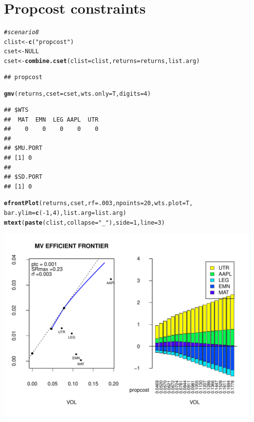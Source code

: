 \documentclass{uwstat518}\usepackage[]{graphicx}\usepackage[]{color}
\makeatletter
\def\maxwidth{ %
  \ifdim\Gin@nat@width>\linewidth
    \linewidth
  \else
    \Gin@nat@width
  \fi
}
\newcommand{\hlstr}[1]{\textcolor[rgb]{0.192,0.494,0.8}{#1}}%
\newcommand{\hlcom}[1]{\textcolor[rgb]{0.678,0.584,0.686}{\textit{#1}}}%
\newcommand{\hlkwd}[1]{\textcolor[rgb]{0.737,0.353,0.396}{\textbf{#1}}}%
\newenvironment{kframe}{%
 \def\at@end@of@kframe{}%
 \ifinner\ifhmode%
  \def\at@end@of@kframe{\end{minipage}}%
  \begin{minipage}{\columnwidth}%
 \fi\fi%
 \def\FrameCommand##1{\hskip\@totalleftmargin \hskip-\fboxsep
 \colorbox{shadecolor}{##1}\hskip-\fboxsep
     \hskip-\linewidth \hskip-\@totalleftmargin \hskip\columnwidth}%
 \MakeFramed {\advance\hsize-\width
   \@totalleftmargin\z@ \linewidth\hsize
   \@setminipage}}%
 {\par\unskip\endMakeFramed%
 \at@end@of@kframe}
\newenvironment{knitrout}{}{} %
\makeatother
\begin{document}
\newpage
\section{Propcost constraints}
\begin{knitrout}
\color{fgcolor}\begin{kframe}
\begin{alltt}
\hlcom{# scenario 8 }
clist <- \hlkwd{c}(\hlstr{"propcost"})
cset <- NULL
cset <-\hlkwd{combine.cset}(clist=clist,returns=returns,list.arg)
\end{alltt}
\begin{verbatim}
## propcost
\end{verbatim}
\begin{alltt}
\hlkwd{gmv}(returns, cset=cset, wts.only=T,digits=4)
\end{alltt}
\begin{verbatim}
## $WTS
##  MAT  EMN  LEG AAPL  UTR 
##    0    0    0    0    0 
## 
## $MU.PORT
## [1] 0
## 
## $SD.PORT
## [1] 0
\end{verbatim}
\begin{alltt}

\hlkwd{efrontPlot}(returns, cset, rf = .003, npoints = 20,wts.plot = T,
		bar.ylim = \hlkwd{c}(-1,4),list.arg=list.arg)
\hlkwd{mtext}(\hlkwd{paste}(clist,collapse=\hlstr{"_"}),side=1,line=3)
\end{alltt}
\end{kframe}
\includegraphics[width=\maxwidth]{figure/unnamed-chunk-11} 

\end{knitrout}
\end{document}
